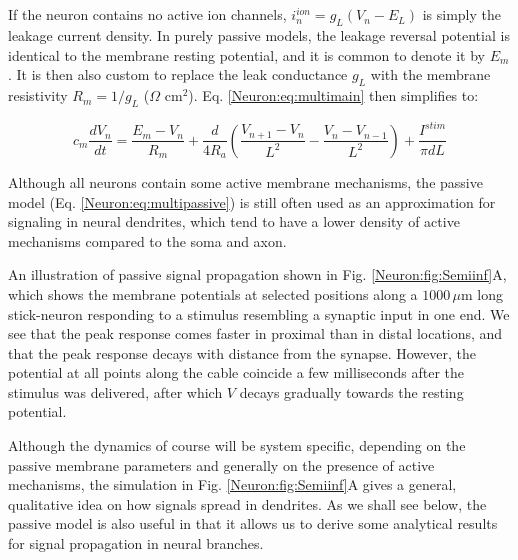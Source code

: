 \subsection{}
\label{sec:Neuron:Passive_multicomp}
If the neuron contains no active ion channels, $i_n^{ion} = g_L(V_n - E_L)$ is simply the leakage current density. In purely passive models, the leakage reversal potential is identical to the membrane resting potential, and it is common to denote it by $E_m$. It is then also custom to replace the leak conductance $g_L$ with the membrane resistivity $R_m = 1/g_L$ ($\Omega$ cm$^2$). Eq. \ref{Neuron:eq:multimain} then simplifies to:

\begin{equation}
c_m \frac{dV_n}{dt} = \frac{E_m-V_n}{R_m} + \frac{d}{4R_a}\left(\frac{V_{n+1}-V_n}{L^2} - \frac{V_n-V_{n-1}}{L^2} \right) + \frac{I^{stim}}{\pi d L}
\label{Neuron:eq:multipassive}
\end{equation}

Although all neurons contain some active membrane mechanisms, the passive model (Eq. \ref{Neuron:eq:multipassive}) is still often used as an approximation for signaling in neural dendrites, which tend to have a lower density of active mechanisms compared to the soma and axon. 

An illustration of passive signal propagation shown in Fig. \ref{Neuron:fig:Semiinf}A, which shows the membrane potentials at selected positions along a $1000 \, \mu$m long stick-neuron responding to a stimulus resembling a synaptic input in one end. We see that the peak response comes faster in proximal than in distal locations, and that the peak response decays with distance from the synapse. However, the potential at all points along the cable coincide a few milliseconds after the stimulus was delivered, after which $V$  decays gradually towards the resting potential.

Although the dynamics of course will be system specific, depending on the passive membrane parameters and generally on the presence of active mechanisms, the simulation in Fig. \ref{Neuron:fig:Semiinf}A gives a general, qualitative idea on how signals spread in dendrites. As we shall see below, the passive model is also useful in that it allows us to derive some analytical results for signal propagation in neural branches.

